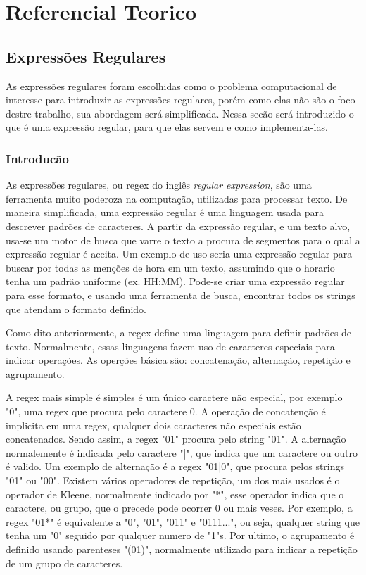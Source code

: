 \section{Referencial Teorico}

\subsection{Expressões Regulares}
As expressões regulares foram escolhidas como o problema computacional de interesse para introduzir as expressões regulares, porém como elas não são o foco destre trabalho, sua abordagem será simplificada.
Nessa secão será introduzido o que é uma expressão regular, para que elas servem e como implementa-las.

\subsubsection{Introducão}
As expressões regulares, ou regex do inglês \emph{regular expression}, são uma ferramenta muito poderoza na computação, utilizadas para processar texto.
De maneira simplificada, uma expressão regular é uma linguagem usada para descrever padrões de caracteres.
A partir da expressão regular, e um texto alvo, usa-se um motor de busca que varre o texto a procura de segmentos para o qual a expressão regular é aceita.
Um exemplo de uso seria uma expressão regular para buscar por todas as menções de hora em um texto, assumindo que o horario tenha um padrão uniforme (ex. HH:MM).
Pode-se criar uma expressão regular para esse formato, e usando uma ferramenta de busca, encontrar todos os strings que atendam o formato definido.

Como dito anteriormente, a regex define uma linguagem para definir padrões de texto.
Normalmente, essas linguagens fazem uso de caracteres especiais para indicar operações.
As operções básica são: concatenação, alternação, repetição e agrupamento.

A regex mais simple é simples é um único caractere não especial, por exemplo "0", uma regex que procura pelo caractere 0.
A operação de concatenção é implicita em uma regex, qualquer dois caracteres não especiais estão concatenados.
Sendo assim, a regex "01" procura pelo string "01".
A alternação normalemente é indicada pelo caractere "|", que indica que um caractere ou outro é valido.
Um exemplo de alternação é a regex "01|0", que procura pelos strings "01" ou "00".
Existem vários operadores de repetição, um dos mais usados é o operador de Kleene, normalmente indicado por "*", esse operador indica que o caractere, ou grupo, que o precede pode ocorrer 0 ou mais veses.
Por exemplo, a regex "01*" é equivalente a "0", "01", "011" e "0111...", ou seja, qualquer string que tenha um "0" seguido por qualquer numero de "1"s.
Por ultimo, o agrupamento é definido usando parenteses "(01)", normalmente utilizado para indicar a repetição de um grupo de caracteres.

